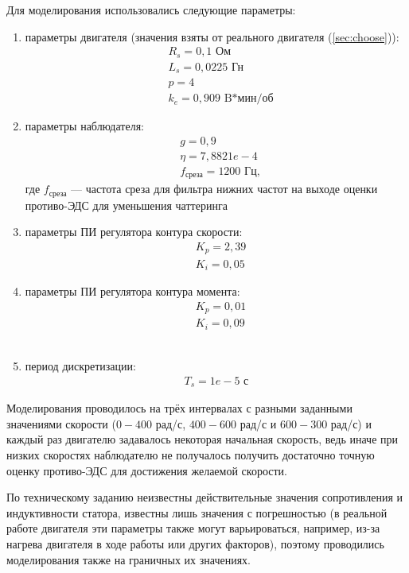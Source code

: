 Для моделирования использовались следующие параметры:
\begin{enumerate}
	\item параметры двигателя (значения взяты от реального двигателя (\ref{sec:choose})):
	\begin{align*}
		&R_s = 0,1\textrm{ Ом}\\
		&L_s = 0,0225\textrm{ Гн}\\
		&p = 4\\
		&k_e = 0,909\textrm{ B*мин/об}
	\end{align*}
	\item параметры наблюдателя:
	\begin{align*}
		&g = 0,9\\
		&\eta = 7,8821e-4\\
		&f_{\textrm{среза}}=1200\textrm{ Гц},
	\end{align*}где $f_{\textrm{среза}}$ --- частота среза для фильтра нижних частот на выходе оценки противо-ЭДС для уменьшения чаттеринга
	\item параметры ПИ регулятора контура скорости:
	\begin{align*}
		&K_p = 2,39\\
		&K_i = 0,05
	\end{align*}
	\item параметры ПИ регулятора контура момента:
	\begin{align*}
		&K_p = 0,01\\
		&K_i = 0,09
	\end{align*}\
	\item период дискретизации:
	\begin{align*}
		T_s = 1e-5\textrm{ с}
	\end{align*}
\end{enumerate}

Моделирования проводилось на трёх интервалах с разными заданными значениями скорости ($0-400$ рад/с, $400-600$ рад/с и $600-300$ рад/с) и каждый раз двигателю задавалось некоторая начальная скорость, ведь иначе при низких скоростях наблюдателю не получалось получить достаточно точную оценку противо-ЭДС для достижения желаемой скорости.

По техническому заданию неизвестны действительные значения сопротивления и индуктивности статора, известны лишь значения с погрешностью (в реальной работе двигателя эти параметры также могут варьироваться, например, из-за нагрева двигателя в ходе работы или других факторов), поэтому проводились моделирования также на граничных их значениях.

